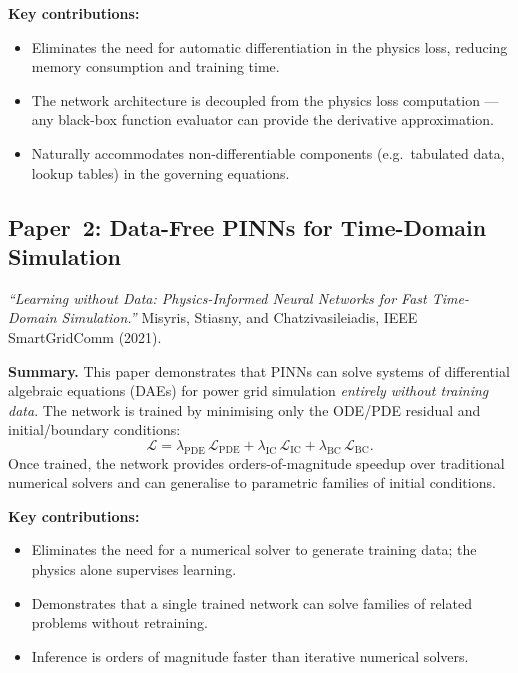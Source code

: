 \documentclass[12pt,a4paper]{article}
\begin{document}
\medskip
\noindent\textbf{Key contributions:}
\begin{itemize}
\item Eliminates the need for automatic differentiation in the physics loss, reducing memory consumption and training time.
\item The network architecture is decoupled from the physics loss computation --- any black-box function evaluator can provide the derivative approximation.
\item Naturally accommodates non-differentiable components (e.g.\ tabulated data, lookup tables) in the governing equations.
\end{itemize}

\subsection{Paper~2: Data-Free PINNs for Time-Domain Simulation}
\label{sec:paper2}

\textit{``Learning without Data: Physics-Informed Neural Networks for Fast Time-Domain Simulation.''} Misyris, Stiasny, and Chatzivasileiadis, IEEE SmartGridComm (2021).

\medskip
\noindent\textbf{Summary.} This paper demonstrates that PINNs can solve systems of differential algebraic equations (DAEs) for power grid simulation \emph{entirely without training data}. The network is trained by minimising only the ODE/PDE residual and initial/boundary conditions:
\begin{equation}
\mathcal{L} = \lambda_{\text{PDE}}\,\mathcal{L}_{\text{PDE}} + \lambda_{\text{IC}}\,\mathcal{L}_{\text{IC}} + \lambda_{\text{BC}}\,\mathcal{L}_{\text{BC}}.
\end{equation}
Once trained, the network provides orders-of-magnitude speedup over traditional numerical solvers and can generalise to parametric families of initial conditions.

\medskip
\noindent\textbf{Key contributions:}
\begin{itemize}
\item Eliminates the need for a numerical solver to generate training data; the physics alone supervises learning.
\item Demonstrates that a single trained network can solve families of related problems without retraining.
\item Inference is orders of magnitude faster than iterative numerical solvers.
\end{itemize}
\end{document}
